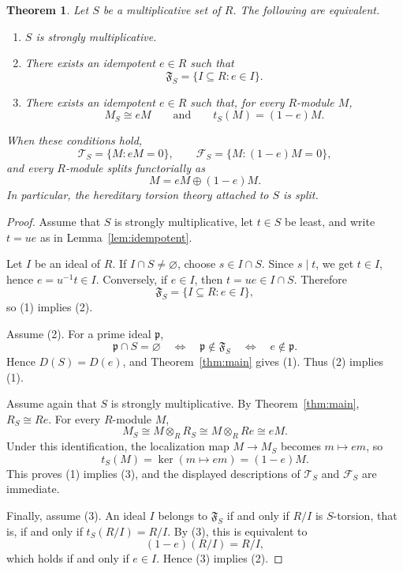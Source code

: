 \documentclass[11pt]{amsart}
\newtheorem{theorem}{Theorem}[section]
\theoremstyle{definition}
\theoremstyle{remark}
\begin{document}
\begin{theorem}\label{thm:torsion}
Let $S$ be a multiplicative set of $R$.
The following are equivalent.
\begin{enumerate}
\item $S$ is strongly multiplicative.
\item There exists an idempotent $e \in R$ such that
\[
\mathfrak F_S=\{I \subseteq R : e \in I\}.
\]
\item There exists an idempotent $e \in R$ such that, for every $R$-module $M$,
\[
M_S \cong eM
\qquad\text{and}\qquad
t_S(M)=(1-e)M.
\]
\end{enumerate}
When these conditions hold,
\[
\mathcal T_S=\{M : eM=0\},
\qquad
\mathcal F_S=\{M : (1-e)M=0\},
\]
and every $R$-module splits functorially as
\[
M=eM \oplus (1-e)M.
\]
In particular, the hereditary torsion theory attached to $S$ is split.
\end{theorem}

\begin{proof}
Assume that $S$ is strongly multiplicative, let $t \in S$ be least, and write $t=ue$ as in Lemma~\ref{lem:idempotent}.

Let $I$ be an ideal of $R$.
If $I \cap S \neq \varnothing$, choose $s \in I \cap S$.
Since $s \mid t$, we get $t \in I$, hence $e=u^{-1}t \in I$.
Conversely, if $e \in I$, then $t=ue \in I \cap S$.
Therefore
\[
\mathfrak F_S=\{I \subseteq R : e \in I\},
\]
so (1) implies (2).

Assume (2).
For a prime ideal $\mathfrak p$,
\[
\mathfrak p \cap S=\varnothing
\quad\Longleftrightarrow\quad
\mathfrak p \notin \mathfrak F_S
\quad\Longleftrightarrow\quad
e \notin \mathfrak p.
\]
Hence $D(S)=D(e)$, and Theorem~\ref{thm:main} gives (1).
Thus (2) implies (1).

Assume again that $S$ is strongly multiplicative.
By Theorem~\ref{thm:main}, $R_S \cong Re$.
For every $R$-module $M$,
\[
M_S
\cong
M \otimes_R R_S
\cong
M \otimes_R Re
\cong
eM.
\]
Under this identification, the localization map $M \to M_S$ becomes $m \mapsto em$, so
\[
t_S(M)=\ker(m \mapsto em)=(1-e)M.
\]
This proves (1) implies (3), and the displayed descriptions of $\mathcal T_S$ and $\mathcal F_S$ are immediate.

Finally, assume (3).
An ideal $I$ belongs to $\mathfrak F_S$ if and only if $R/I$ is $S$-torsion, that is, if and only if $t_S(R/I)=R/I$.
By (3), this is equivalent to
\[
(1-e)(R/I)=R/I,
\]
which holds if and only if $e \in I$.
Hence (3) implies (2).
\end{proof}
\end{document}
